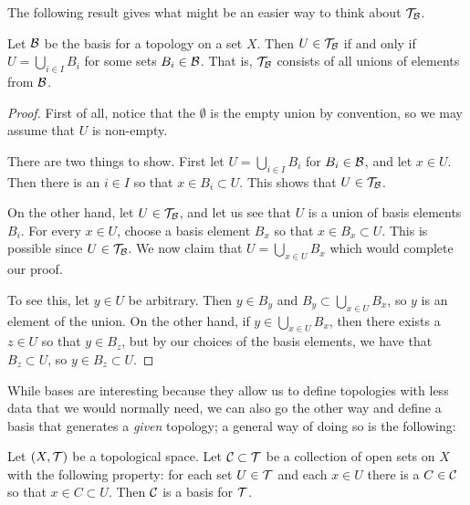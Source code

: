 The following result gives what might be an easier way to think about $\mathcal{T}_{\mathcal{B}}$.
\begin{lem}
  \label{genereated-by-unions}
  Let $\mathcal{B}$ be the basis for a topology on a set $X$. Then $U \in \mathcal{T}_{\mathcal{B}}$ if and only if $U = \bigcup_{i \in I} B_i$ for some sets $B_i \in \mathcal{B}$. That is, $\mathcal{T}_{\mathcal{B}}$ consists of all unions of elements from $\mathcal{B}$.
\end{lem}
\begin{proof}
  First of all, notice that the $\emptyset$ is the empty union by convention, so we may assume that $U$ is non-empty.

  There are two things to show. First let $U = \bigcup_{i \in I} B_i$ for $B_i \in \mathcal{B}$, and let $x \in U$. Then there is an $i \in I$ so that $x \in B_i \subset U$. This shows that $U \in \mathcal{T}_{\mathcal{B}}$.
  
  On the other hand, let $U \in \mathcal{T}_{\mathcal{B}}$, and let us see that $U$ is a union of basis elements $B_i$. For every $x \in U$, choose a basis element $B_x$ so that $x \in B_x \subset U$. This is possible since $U \in \mathcal{T}_{\mathcal{B}}$. We now claim that $U = \bigcup_{x \in U} B_x$ which would complete our proof.
  
  To see this, let $y \in U$ be arbitrary. Then $y \in B_y$ and $B_y \subset \bigcup_{x \in U} B_x$, so $y$ is an element of the union. On the other hand, if $y \in \bigcup_{x \in U} B_x$, then there exists a $z \in U$ so that $y \in B_z$, but by our choices of the basis elements, we have that $B_z \subset U$, so $y \in B_z \subset U$.
\end{proof}
While bases are interesting because they allow us to define topologies with less data that we would normally need, we can also go the other way and define a basis that generates a \emph{given} topology; a general way of doing so is the following:
\begin{lem}
  Let $(X,\mathcal{T})$ be a topological space. Let $\mathcal{C} \subset \mathcal{T}$ be a collection of open sets on $X$ with the following property: for each set $U \in \mathcal{T}$ and each $x \in U$ there is a $C \in \mathcal{C}$ so that $x \in C \subset U$. Then $\mathcal{C}$ is a basis for $\mathcal{T}$.
\end{lem}
